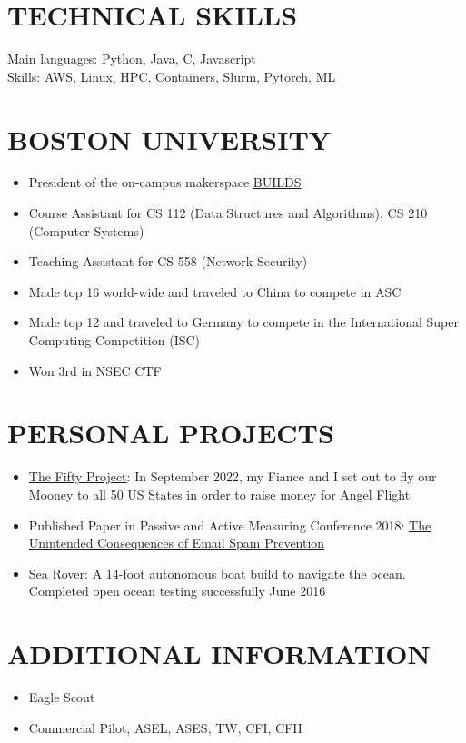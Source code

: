 \documentclass{res}
\begin{document}
\begin{resume}
\section{TECHNICAL SKILLS}          
    Main languages: Python, Java, C, Javascript \\         
    Skills: AWS, Linux, HPC, Containers, Slurm, Pytorch, ML
\vspace{-0.10in}
\section{BOSTON UNIVERSITY}    
	\begin{itemize}
   	\setlength\itemsep{0em}
        \item President of the on-campus makerspace \href{http://builds.cc}{BUILDS}
        \item Course Assistant for CS 112 (Data Structures and Algorithms), CS 210 (Computer Systems)
        \item Teaching Assistant for CS 558 (Network Security)
        \item Made top 16 world-wide and traveled to China to compete in ASC
        \item Made top 12 and traveled to Germany to compete in the International Super Computing Competition (ISC)
        \item Won 3rd in NSEC CTF
        \end{itemize}
\vspace{-0.10in}
\section{PERSONAL PROJECTS}    
	\begin{itemize}
   	\setlength\itemsep{0em}   
         \item \href{https://thefiftyproject.com/}{The Fifty Project}: In September 2022, my Fiance and I set out to fly our Mooney to all 50 US States in order to raise money for Angel Flight
  		 \item Published Paper in Passive and Active Measuring Conference 2018: \href{https://www.cs.huji.ac.il/~yossigi/pam18.pdf}{The Unintended Consequences of Email Spam Prevention}
         \item \href{https://www.kickstarter.com/projects/bdommie/sea-rover}{Sea Rover}: A 14-foot autonomous boat build to navigate the ocean. Completed open ocean testing successfully June 2016
    		\end{itemize}
\vspace{-0.10in}
    \section{ADDITIONAL INFORMATION} 
    	\begin{itemize}
	\setlength\itemsep{0em}
  		\item Eagle Scout  
  		\item Commercial Pilot, ASEL, ASES, TW, CFI, CFII
	\end{itemize}           
 
\end{resume}
\end{document}
